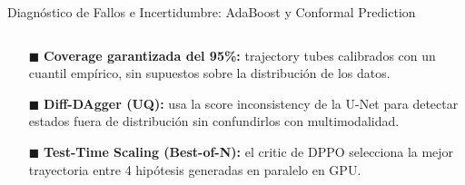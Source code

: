 \documentclass[aspectratio=169,10pt,xcolor={dvipsnames,table}]{beamer}
\newcommand{\CardTitleFont}{\fontsize{7.5}{9}\selectfont\bfseries}      %
\newcommand{\BodyFont}{\fontsize{6.2}{7.8}\selectfont}                  %
\newcommand{\CardArc}{2pt}                 %
\newcommand{\CardRule}{0.6pt}              %
\newcommand{\CardHeightDouble}{42.5mm}     %
\begin{document}
\begin{frame}{Diagnóstico de Fallos e Incertidumbre: AdaBoost y Conformal Prediction}
\begin{columns}[T, onlytextwidth]
    \begin{column}{0.485\textwidth}
      \begin{tcolorbox}[
        enhanced,
        colback=WhiteBg,
        colframe=UCNCyan,
        arc=\CardArc,
        boxrule=\CardRule,
        height=\CardHeightDouble,
        title={\CardTitleFont Conformal Prediction (PlanCP) y Verifiers},
        colbacktitle=UCNCyan,
        coltitle=WhiteBg,
        top=1.2mm, bottom=1.2mm, left=1.8mm, right=1.8mm
      ]
        {\BodyFont
        \begin{itemize}\setlength{\itemsep}{1.8pt}
          \item[\textcolor{UCNCyan}{$\blacksquare$}] \textbf{Coverage garantizada del 95\%:} trajectory tubes calibrados con un cuantil empírico, sin supuestos sobre la distribución de los datos.
          \item[\textcolor{UCNCyan}{$\blacksquare$}] \textbf{Diff-DAgger (UQ):} usa la score inconsistency de la U-Net para detectar estados fuera de distribución sin confundirlos con multimodalidad.
          \item[\textcolor{UCNCyan}{$\blacksquare$}] \textbf{Test-Time Scaling (Best-of-N):} el critic de DPPO selecciona la mejor trayectoria entre 4 hipótesis generadas en paralelo en GPU.
        \end{itemize}}
      \end{tcolorbox}
    \end{column}
  \end{columns}
\end{frame}
\end{document}
